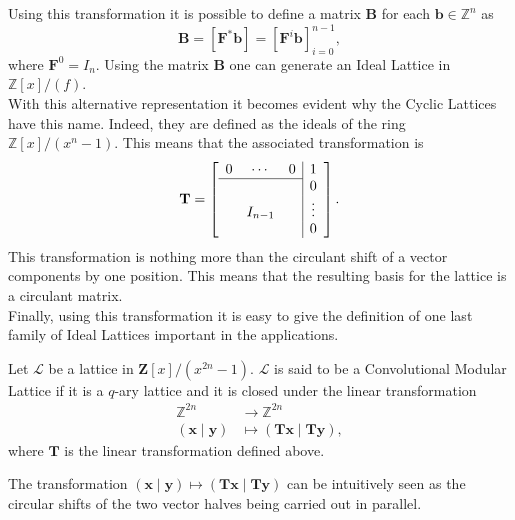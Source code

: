 Using this transformation it is possible to define a matrix $\mathbf{B}$ for each $\mathbf{b}\in\mathbb{Z}^n$ as
\begin{equation*}
\mathbf{B}=[\mathbf{F}^*\mathbf{b}]=\left[\mathbf{F}^{i}\mathbf{b}\right]_{i=0}^{n-1},
\end{equation*}
where $\mathbf{F}^0=I_n$. Using the matrix $\mathbf{B}$ one can generate an Ideal Lattice in $\mathbb{Z}[x]/(f)$.\\
With this alternative representation it becomes evident why the Cyclic Lattices have this name. Indeed, they are defined as the ideals of the ring $\mathbb{Z}[x]/(x^n-1)$. This means that the associated transformation is
\begin{equation*}
\mathbf{T}=
\left[\begin{array}{ccc|c}
0&\cdots&0&1\\
\cline{1-3}
&&&0\\
&I_{n-1}&&\vdots\\
&&&0
\end{array}\right].
\end{equation*}
This transformation is nothing more than the circulant shift of a vector components by one position. This means that the resulting basis for the lattice is a circulant matrix.\\
Finally, using this transformation it is easy to give the definition of one last family of Ideal Lattices important in the applications.
\begin{definition}
Let $\mathscr{L}$ be a lattice in $\mathbf{Z}[x]/(x^{2n}-1)$. $\mathscr{L}$ is said to be a Convolutional Modular Lattice if it is a $q$-ary lattice and it is closed under the linear transformation
\begin{align*}
\mathbb{Z}^{2n}&\rightarrow \mathbb{Z}^{2n} \\
(\mathbf{x}\mid\mathbf{y}) &\mapsto (\mathbf{Tx}\mid\mathbf{Ty}),
\end{align*}
where $\mathbf{T}$ is the linear transformation defined above.
\end{definition}
\begin{remark}
The transformation $(\mathbf{x}\mid\mathbf{y}) \mapsto (\mathbf{Tx}\mid\mathbf{Ty})$ can be intuitively seen as the circular shifts of the two vector halves being carried out in parallel.
\end{remark}

